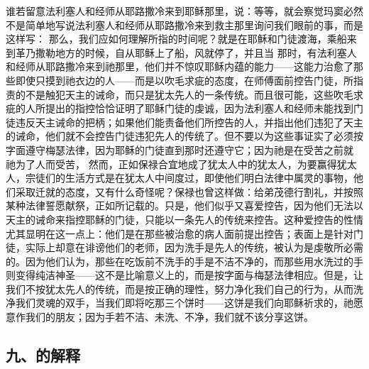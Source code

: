   谁若留意法利塞人和经师从耶路撒冷来到耶稣那里，说：等等，就会察觉玛窦必然不是简单地写说法利塞人和经师从耶路撒冷来到救主那里询问我们眼前的事，而是这样写： 那么，我们应如何理解所指的时间呢？就是在耶稣和门徒渡海，乘船来到革乃撒勒地方的时候，自从耶稣上了船，风就停了，并且当  那时，有法利塞人和经师从耶路撒冷来到祂那里，他们并不惊叹耶稣内蕴的能力——这能力治愈了那些即使只摸到祂衣边的人——而是以吹毛求疵的态度，在师傅面前控告门徒，所指责的不是触犯天主的诫命，而只是犹太先人的一条传统。而且很可能，这些吹毛求疵的人所提出的指控恰恰证明了耶稣门徒的虔诚，因为法利塞人和经师未能找到门徒违反天主诫命的把柄；如果他们能责备他们所控告的人，并指出他们违犯了天主的诫命，他们就不会控告门徒违犯先人的传统了。但不要以为这些事证实了必须按字面遵守梅瑟法律，因为耶稣的门徒直到那时还遵守它；因为祂是在受苦之前就  祂为了人而受苦， 然而，正如保禄合宜地成了犹太人中的犹太人，为要赢得犹太人，宗徒们的生活方式是在犹太人中间度过，即使他们明白法律中属灵的事物，他们采取迁就的态度，又有什么奇怪呢？保禄也曾这样做：给弟茂德行割礼，并按照某种法律誓愿献祭，正如所记载的。只是，他们似乎又喜爱控告，因为他们无法以天主的诫命来指控耶稣的门徒，只能以一条先人的传统来控告。这种爱控告的性情尤其显明在这一点上：他们是在那些被治愈的病人面前提出控告；表面上是针对门徒，实际上却意在诽谤他们的老师，因为洗手是先人的传统，被认为是虔敬所必需的。因为他们认为，那些在吃饭前不洗手的手是不洁不净的，而那些用水洗过的手则变得纯洁神圣——这不是比喻意义上的，而是按字面与梅瑟法律相应。但是，让我们不按犹太先人的传统，而是按正确的理性，努力净化我们自己的行为，从而洗净我们灵魂的双手，当我们即将吃那三个饼时——这饼是我们向耶稣祈求的，祂愿意作我们的朋友；因为手若不洁、未洗、不净，我们就不该分享这饼。\par


\subsection{九、的解释}

